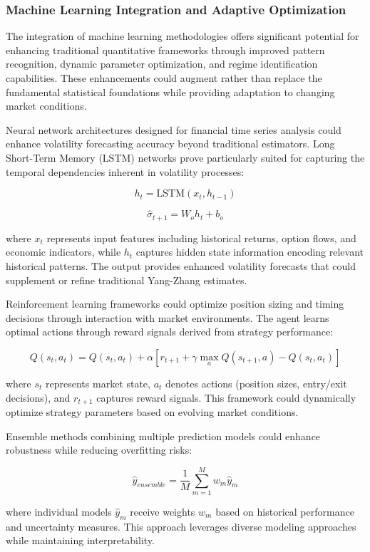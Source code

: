 \documentclass[
  american,
  11pt,
  11pt,
  letterpaper,
  onecolumn]{article}
\begin{document}
\subsubsection{Machine Learning Integration and Adaptive
Optimization}\label{machine-learning-integration-and-adaptive-optimization}

The integration of machine learning methodologies offers significant
potential for enhancing traditional quantitative frameworks through
improved pattern recognition, dynamic parameter optimization, and regime
identification capabilities. These enhancements could augment rather
than replace the fundamental statistical foundations while providing
adaptation to changing market conditions.

Neural network architectures designed for financial time series analysis
could enhance volatility forecasting accuracy beyond traditional
estimators. Long Short-Term Memory (LSTM) networks prove particularly
suited for capturing the temporal dependencies inherent in volatility
processes:

\[h_t = \text{LSTM}(x_t, h_{t-1})\]

\[\hat{\sigma}_{t+1} = W_o h_t + b_o\]

where \(x_t\) represents input features including historical returns,
option flows, and economic indicators, while \(h_t\) captures hidden
state information encoding relevant historical patterns. The output
provides enhanced volatility forecasts that could supplement or refine
traditional Yang-Zhang estimates.

Reinforcement learning frameworks could optimize position sizing and
timing decisions through interaction with market environments. The agent
learns optimal actions through reward signals derived from strategy
performance:

\[Q(s_t, a_t) = Q(s_t, a_t) + \alpha[r_{t+1} + \gamma \max_a Q(s_{t+1}, a) - Q(s_t, a_t)]\]

where \(s_t\) represents market state, \(a_t\) denotes actions (position
sizes, entry/exit decisions), and \(r_{t+1}\) captures reward signals.
This framework could dynamically optimize strategy parameters based on
evolving market conditions.

Ensemble methods combining multiple prediction models could enhance
robustness while reducing overfitting risks:

\[\hat{y}_{ensemble} = \frac{1}{M}\sum_{m=1}^{M} w_m \hat{y}_m\]

where individual models \(\hat{y}_m\) receive weights \(w_m\) based on
historical performance and uncertainty measures. This approach leverages
diverse modeling approaches while maintaining interpretability.
\end{document}
